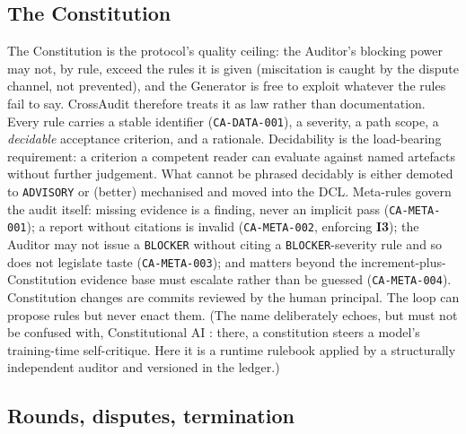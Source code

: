 \documentclass[11pt]{article}
\newcommand{\invariant}[1]{\textbf{I#1}}
\newcommand{\rulename}[1]{\texttt{#1}}
\begin{document}
\subsection{The Constitution}\label{sec:constitution}

The Constitution is the protocol's quality ceiling: the Auditor's blocking power may not, by rule, exceed the rules it is given (miscitation is caught by the dispute channel, not prevented), and the Generator is free to exploit whatever the rules fail to say. CrossAudit therefore treats it as law rather than documentation. Every rule carries a stable identifier (\rulename{CA-DATA-001}), a severity, a path scope, a \emph{decidable} acceptance criterion, and a rationale. Decidability is the load-bearing requirement: a criterion a competent reader can evaluate against named artefacts without further judgement. What cannot be phrased decidably is either demoted to \texttt{ADVISORY} or (better) mechanised and moved into the DCL. Meta-rules govern the audit itself: missing evidence is a finding, never an implicit pass (\rulename{CA-META-001}); a report without citations is invalid (\rulename{CA-META-002}, enforcing \invariant{3}); the Auditor may not issue a \texttt{BLOCKER} without citing a \texttt{BLOCKER}-severity rule and so does not legislate taste (\rulename{CA-META-003}); and matters beyond the increment-plus-Constitution evidence base must escalate rather than be guessed (\rulename{CA-META-004}). Constitution changes are commits reviewed by the human principal. The loop can propose rules but never enact them. (The name deliberately echoes, but must not be confused with, Constitutional AI \cite{bai2022constitutional}: there, a constitution steers a model's training-time self-critique. Here it is a runtime rulebook applied by a structurally independent auditor and versioned in the ledger.)

\subsection{Rounds, disputes, termination}\label{sec:rounds}
\end{document}
